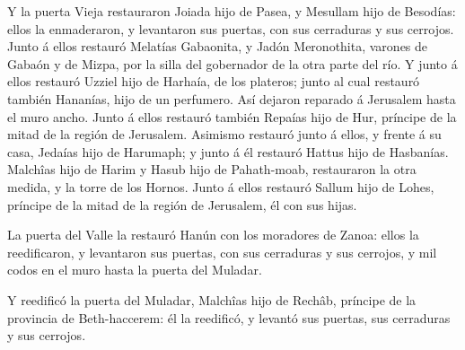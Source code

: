  Y la puerta Vieja restauraron Joiada hijo de Pasea, y
Mesullam hijo de Besodías: ellos la enmaderaron, y levantaron sus
puertas, con sus cerraduras y sus cerrojos.  Junto á ellos
restauró Melatías Gabaonita, y Jadón Meronothita, varones de Gabaón y de
Mizpa, por la silla del gobernador de la otra parte del río.
 Y junto á ellos restauró Uzziel hijo de Harhaía, de los
plateros; junto al cual restauró también Hananías, hijo de un perfumero.
Así dejaron reparado á Jerusalem hasta el muro ancho.  Junto
á ellos restauró también Repaías hijo de Hur, príncipe de la mitad de la
región de Jerusalem.  Asimismo restauró junto á ellos, y
frente á su casa, Jedaías hijo de Harumaph; y junto á él restauró Hattus
hijo de Hasbanías.  Malchîas hijo de Harim y Hasub hijo de
Pahath-moab, restauraron la otra medida, y la torre de los Hornos.
 Junto á ellos restauró Sallum hijo de Lohes, príncipe de
la mitad de la región de Jerusalem, él con sus hijas.

 La puerta del Valle la restauró Hanún con los moradores de
Zanoa: ellos la reedificaron, y levantaron sus puertas, con sus
cerraduras y sus cerrojos, y mil codos en el muro hasta la puerta del
Muladar.

 Y reedificó la puerta del Muladar, Malchîas hijo de
Rechâb, príncipe de la provincia de Beth-haccerem: él la reedificó, y
levantó sus puertas, sus cerraduras y sus cerrojos.

